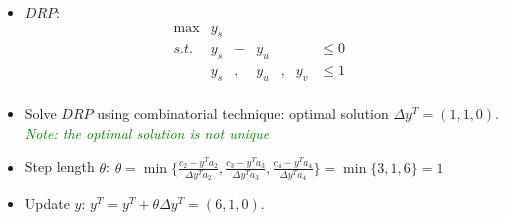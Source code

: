 \documentclass[mathserif]{beamer}
\begin{document}
{\begin{small}
\begin{itemize}
\[\]
%   
\item $DRP$:   
\[
\begin{array}{rrrrrrrrrl}
 \max & y_s   & &    \\
 s.t. & y_s &-& y_u  & &     &  \leq 0 &  \\
      & y_s &,& y_u  &,& y_v &  \leq 1 &  \\
\end{array} \nonumber
\]
  


\item  Solve $DRP$  using combinatorial technique: optimal solution  $\Delta {y^T} = (1, 1, 0)$. \textcolor{green}{{\it Note: the optimal solution  is not unique}}

\item Step length $\theta$: $\theta = \min \{ 
\frac{ {c_2 - y^Ta_2} }{ {\Delta y^T a_2}  }, 
\frac{ {c_3 - y^Ta_3} }{ {\Delta y^T a_3}  },  
\frac{ {c_4 - y^Ta_4} }{ {\Delta y^T a_4}  }  
\} = \min\{ 3, 1, 6\} = 1$

\item Update ${y}$: ${y^T=y^T}+\theta \Delta {y^T}  = (6, 1, 0)$. 


\end{itemize}
\end{small}}
\end{document}
